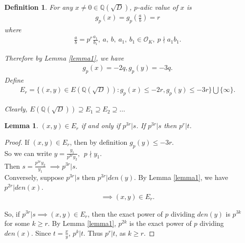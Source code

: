 \documentclass[12pt,leqno]{amsart}
\newcommand{\<}{\langle}
\renewcommand{\>}{\rangle}
\newtheorem*{definition}{Definition}
\newtheorem{lemma}{Lemma}
\theoremstyle{definition}
\numberwithin{equation}{section}
\begin{document}
\begin{definition}
    For any $x\neq 0\in \mathbb Q(\sqrt{D})$, $p$-adic value of $x$ is
    \begin{align*}
        g_p(x)=g_p(\frac{a}{b})=r
    \end{align*}
    where\\
    \begin{align*}
       \frac{a}{b}=p^r\frac{a_1}{b_1},~a,~b,~a_1,~b_1\in{\mathcal{O}_K},~p\nmid a_1b_1. 
    \end{align*}
    
    Therefore by Lemma \ref{lemma1}, we have
    \begin{align*}
        g_p(x)=-2q, g_p(y)=-3q.
    \end{align*}
    Define\\
    \begin{align*}
         E_r=\{(x,y)\in E(\mathbb Q(\sqrt{D})):g_p(x)\leq -2r, g_p(y)\leq -3r\}\bigcup \{\infty\}.
    \end{align*}
   
    \smallskip
    Clearly, $E(\mathbb Q(\sqrt{D}))\supseteq E_1\supseteq E_2\supseteq\ldots$
\end{definition}
\begin{lemma}\label{lemma3}
$(x,y)\in E_r$ if and only if $p^{3r}\vert s$. If $p^{3r}\vert s$ then $p^{r}\vert t$.
\end{lemma}
\begin{proof}
    If $(x,y)\in E_r$, then by definition $g_p(y)\leq-3r$.\\
    So we can write $y=\frac{y_1}{p^{3r}y_2},~~p\nmid y_1$. \\Then $s=\frac{p^{3r}y_2}{y_1}$ $\implies p^{3r}\vert s$.\\ 
    \smallskip
    Conversely, suppose $p^{3r}\vert s$ then $p^{3r}\vert den(y)$. By Lemma \ref{lemma1}, we have $p^{2r}\vert den(x)$. 
    \begin{align*}
         \implies (x,y)\in E_r.
    \end{align*}
    
    \smallskip
    So, if $p^{3r}\vert s\implies (x,y)\in E_r$, then the exact power of $p$ dividing $den(y)$ is $p^{3k}$ for some $k\geq r$. By Lemma \ref{lemma1}, $p^{2k}$ is the exact power of $p$ dividing $den(x)$. Since $t=\frac{x}{y}$, $p^k\vert t$. Thus $p^r\vert t$, as $k\geq r$.
    
\end{proof}
\end{document}
